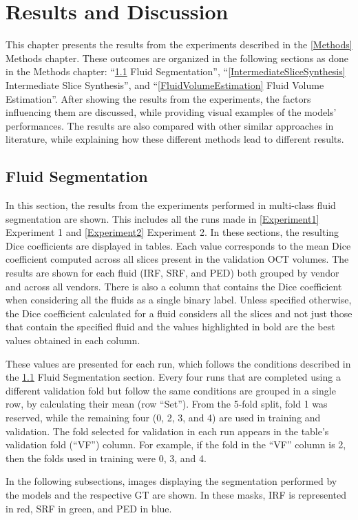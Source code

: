 \chapter{Results and Discussion}\label{ResultsDiscussion}

This chapter presents the results from the experiments described in the \ref{Methods} Methods chapter. These outcomes are organized in the following sections as done in the Methods chapter: ``\ref{FluidSegmentation} Fluid Segmentation'', ``\ref{IntermediateSliceSynthesis} Intermediate Slice Synthesis'', and ``\ref{FluidVolumeEstimation} Fluid Volume Estimation''. After showing the results from the experiments, the factors influencing them are discussed, while providing visual examples of the models' performances. The results are also compared with other similar approaches in literature, while explaining how these different methods lead to different results.

\section{Fluid Segmentation}\label{FluidSegmentation}
In this section, the results from the experiments performed in multi-class fluid segmentation are shown. This includes all the runs made in \ref{Experiment1} Experiment 1 and \ref{Experiment2} Experiment 2. In these sections, the resulting Dice coefficients are displayed in tables. Each value corresponds to the mean Dice coefficient computed across all slices present in the validation OCT volumes. The results are shown for each fluid (IRF, SRF, and PED) both grouped by vendor and across all vendors. There is also a column that contains the Dice coefficient when considering all the fluids as a single binary label. Unless specified otherwise, the Dice coefficient calculated for a fluid considers all the slices and not just those that contain the specified fluid and the values highlighted in bold are the best values obtained in each column. 
\par
These values are presented for each run, which follows the conditions described in the \ref{FluidSegmentation} Fluid Segmentation section. Every four runs that are completed using a different validation fold but follow the same conditions are grouped in a single row, by calculating their mean (row ``Set''). From the 5-fold split, fold 1 was reserved, while the remaining four (0, 2, 3, and 4) are used in training and validation. The fold selected for validation in each run appears in the table's validation fold (``VF'') column. For example, if the fold in the ``VF'' column is 2, then the folds used in training were 0, 3, and 4.
\par
In the following subsections, images displaying the segmentation performed by the models and the respective GT are shown. In these masks, IRF is represented in red, SRF in green, and PED in blue.

